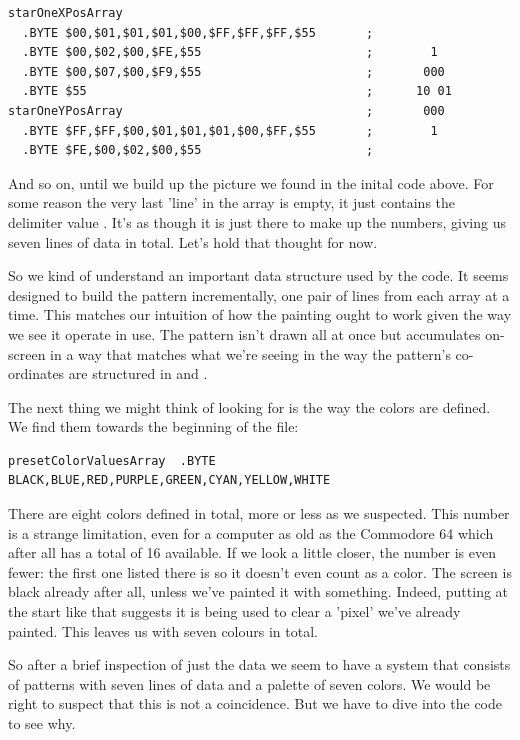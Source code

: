 \begin{lstlisting}[caption=Source code for the Star.]
starOneXPosArray  
  .BYTE $00,$01,$01,$01,$00,$FF,$FF,$FF,$55       ;                
  .BYTE $00,$02,$00,$FE,$55                       ;        1 
  .BYTE $00,$07,$00,$F9,$55                       ;       000      
  .BYTE $55                                       ;      10 01       
starOneYPosArray                                  ;       000
  .BYTE $FF,$FF,$00,$01,$01,$01,$00,$FF,$55       ;        1  
  .BYTE $FE,$00,$02,$00,$55                       ; 
\end{lstlisting}

And so on, until we build up the picture we found in the inital code above. For some reason the very last 'line' in the 
array is empty, it just contains the delimiter value . It's as though it is just there to make up the numbers, giving us
seven lines of data in total. Let's hold that thought for now.

So we kind of understand an important data structure used
by the code. It seems designed to build the pattern incrementally, one pair of lines from each array at a time.
This matches our intuition of how the painting ought to work given the way we see it operate in use. The pattern isn't drawn
all at once but accumulates on-screen in a way that matches what we're seeing in the way the pattern's co-ordinates
are structured in  and .

The next thing we might think of looking for is the way the colors are defined. We find them towards the beginning of the file:
\begin{lstlisting}
presetColorValuesArray  .BYTE BLACK,BLUE,RED,PURPLE,GREEN,CYAN,YELLOW,WHITE
\end{lstlisting}

There are eight colors defined in total, more or less as we suspected. This number is a strange limitation, even for a computer as old
as the Commodore 64 which after all has a total of 16 available. If we look a little closer, the number is even
fewer: the first one listed there is  so it doesn't even count as a color. The screen is black already after all, unless we've
painted it with something. Indeed, putting  at the 
start like that suggests it is being used to clear a 'pixel' we've already painted. This leaves us with seven 
colours in total. 

So after a brief inspection of just the data we seem to have a system that consists of patterns with seven lines of data and a palette
of seven colors. We would be right to suspect that this is not a coincidence. But we have to dive into the code to see why.

